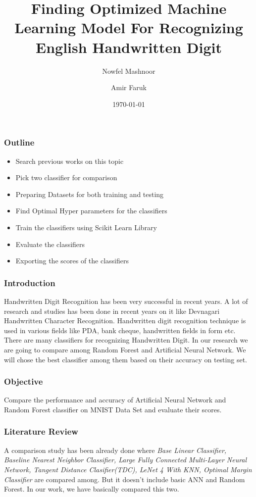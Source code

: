 \documentclass{beamer}
\title{Finding Optimized Machine Learning Model For Recognizing English Handwritten Digit}
\author{Nowfel Mashnoor\and Amir Faruk}
\institute{Rajshahi University of Engineering and Technology}
\date{\today}
\begin{document}
\begin{frame}
\titlepage
\end{frame}

\begin{frame}
\frametitle{Outline}
\begin{itemize}
  \item Search previous works on this topic
  \item Pick two classifier for comparison
  \item Preparing Datasets for both training and testing
  \item Find Optimal Hyper parameters for the classifiers
  \item Train the classifiers using Scikit Learn Library
  \item Evaluate the classifiers
  \item Exporting the scores of the classifiers  
\end{itemize}
\end{frame}

\begin{frame}
\frametitle{Introduction}
Handwritten Digit Recognition has been very successful in recent years. A lot of research and studies has been done in recent years on it like Devnagari Handwritten Character Recognition. Handwritten digit recognition technique is used in various fields like PDA, bank cheque, handwritten fields in form etc. There are many classifiers for recognizing Handwritten Digit. In our research we are going to compare among Random Forest and Artificial Neural Network. We will chose the best classifier among them based on their accuracy on testing set.
\end{frame}

\begin{frame}
\frametitle{Objective}

Compare the performance and accuracy of Artificial Neural Network and Random Forest classifier on MNIST Data Set and evaluate their scores.

\end{frame}

\begin{frame}
\frametitle{Literature Review}
A comparison study has been already done where \textit{Base Linear Classifier, Baseline Nearest Neighbor Classifier, Large Fully Connected Multi-Layer Neural Network, Tangent Distance Clasifier(TDC), LeNet 4 With KNN, Optimal Margin Classifier} are compared among. But it doesn't include basic ANN and Random Forest. In our work, we have basically compared this two.

\end{frame}
\end{document}
